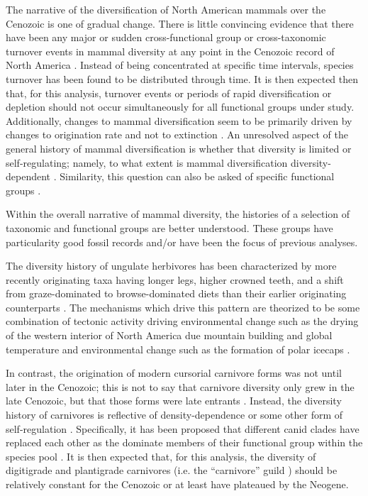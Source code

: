 The narrative of the diversification of North American mammals over the Cenozoic is one of gradual change. There is little convincing evidence that there have been any major or sudden cross-functional group or cross-taxonomic turnover events in mammal diversity at any point in the Cenozoic record of North America \citep{Alroy2009,Alroy1996a,Eronen2015,Janis1993b,Alroy2000g}. Instead of being concentrated at specific time intervals, species turnover has been found to be distributed through time. It is then expected then that, for this analysis, turnover events or periods of rapid diversification or depletion should not occur simultaneously for all functional groups under study. Additionally, changes to mammal diversification seem to be primarily driven by changes to origination rate and not to extinction \citep{Alroy1996a,Alroy2000g,Alroy2009}. An unresolved aspect of the general history of mammal diversification is whether that diversity is limited or self-regulating; namely, to what extent is mammal diversification diversity-dependent \citep{Alroy2009,Rabosky2015b,Harmon2015a,Rabosky2013a}. Similarity, this question can also be asked of specific functional groups \citep{Jernvall2004,Valkenburgh1999,Silvestro2015b,Quental2013}.

Within the overall narrative of mammal diversity, the histories of a selection of taxonomic and functional groups are better understood. These groups have particularity good fossil records and/or have been the focus of previous analyses.

The diversity history of ungulate herbivores has been characterized by more recently originating taxa having longer legs, higher crowned teeth, and a shift from graze-dominated to browse-dominated diets than their earlier originating counterparts \citep{Janis2004,Janis2000,Janis1993b,Janis2008a,Cantalapiedra2017,Fraser2015a}. The mechanisms which drive this pattern are theorized to be some combination of tectonic activity driving environmental change such as the drying of the western interior of North America due mountain building and global temperature and environmental change such as the formation of polar icecaps \citep{Janis2008a,Eronen2015,Blois2009,Badgley2017}. 

In contrast, the origination of modern cursorial carnivore forms was not until later in the Cenozoic; this is not to say that carnivore diversity only grew in the late Cenozoic, but that those forms were late entrants \citep{Janis1993c}. Instead, the diversity history of carnivores is reflective of density-dependence or some other form of self-regulation \citep{Valkenburgh1999,Silvestro2015b,Slater2015c}. Specifically, it has been proposed that different canid clades have replaced each other as the dominate members of their functional group within the species pool \citep{Silvestro2015b,Valkenburgh1999}. It is then expected that, for this analysis, the diversity of digitigrade and plantigrade carnivores (i.e. the ``carnivore'' guild \citep{Valkenburgh1999}) should be relatively constant for the Cenozoic or at least have plateaued by the Neogene.


